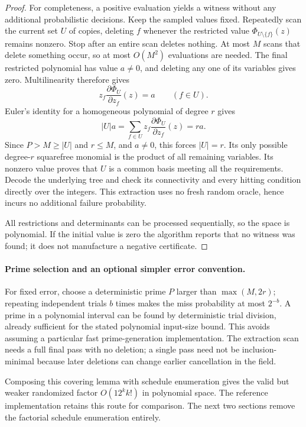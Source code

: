 \begin{proof}
For completeness, a positive evaluation yields a witness without any
additional probabilistic decisions.  Keep the sampled values fixed.
Repeatedly scan the current set $U$ of copies, deleting $f$ whenever the
restricted value $\Phi_{U\setminus\{f\}}(z)$ remains nonzero.  Stop after
an entire scan deletes nothing.  At most $M$ scans that delete something
occur, so at most $O(M^2)$ evaluations are needed.  The final restricted
polynomial has value $a\ne0$, and deleting any one of its variables gives
zero.  Multilinearity therefore gives
\[
                   z_f\frac{\partial\Phi_U}{\partial z_f}(z)=a
                            \qquad(f\in U).
\]
Euler's identity for a homogeneous polynomial of degree $r$ gives
\[
             |U|a=\sum_{f\in U}z_f
                  \frac{\partial\Phi_U}{\partial z_f}(z)=ra.
\]
Since $P>M\geq|U|$ and $r\leq M$, and $a\ne0$, this forces $|U|=r$.
Its only possible degree-$r$ squarefree monomial is the product of all
remaining variables.  Its nonzero value proves that $U$ is a common basis
meeting all the requirements.  Decode the underlying tree and check its
connectivity and every hitting condition directly over the integers.
This extraction uses no fresh random oracle, hence incurs no additional
failure probability.

All restrictions and determinants can be processed sequentially, so the
space is polynomial.  If the initial value is zero the algorithm reports
that no witness was found; it does not manufacture a negative certificate.
\end{proof}

\paragraph{Prime selection and an optional simpler error convention.}
For fixed error, choose a deterministic prime $P$ larger than
$\max(M,2r)$; repeating independent trials $b$ times makes the miss
probability at most $2^{-b}$.  A prime in a polynomial interval can be found
by deterministic trial division, already sufficient for the stated
polynomial input-size bound.  This avoids assuming a particular fast
prime-generation implementation.  The extraction scan needs a full final
pass with no deletion; a single pass need not be inclusion-minimal because
later deletions can change earlier cancellation in the field.


Composing this covering lemma with schedule enumeration gives the valid
but weaker randomized factor $O(12^k k!)$ in polynomial space.  The
reference implementation retains this route for comparison.  The next two
sections remove the factorial schedule enumeration entirely.
